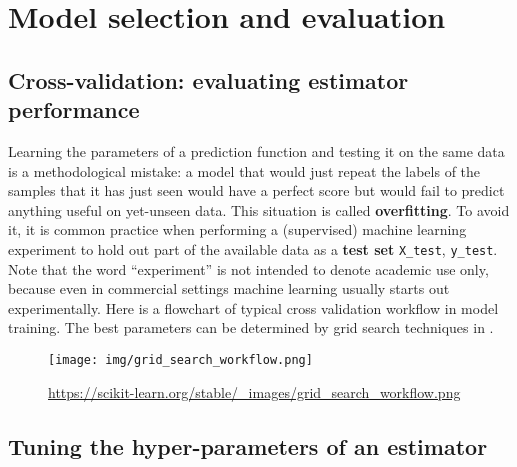 \chapter{Model selection and evaluation}
\section{Cross-validation: evaluating estimator performance}
Learning the parameters of a prediction function and testing it on the same data is a methodological mistake: a model that would just repeat the labels of the samples that it has just seen would have a perfect score but would fail to predict anything useful on yet-unseen data. This situation is called \textbf{overfitting}. To avoid it, it is common practice when performing a (supervised) machine learning experiment to hold out part of the available data as a \textbf{test set} \texttt{X\_test}, \texttt{y\_test}. Note that the word “experiment” is not intended to denote academic use only, because even in commercial settings machine learning usually starts out experimentally. Here is a flowchart of typical cross validation workflow in model training. The best parameters can be determined by grid search techniques in .
\begin{figure}[H]
\centering
\texttt{[image: img/grid\_search\_workflow.png]}
\caption{\url{https://scikit-learn.org/stable/_images/grid_search_workflow.png}}
\label{s}
\end{figure}


\section{Tuning the hyper-parameters of an estimator\label{Tuning the hyper-parameters of an estimator}}